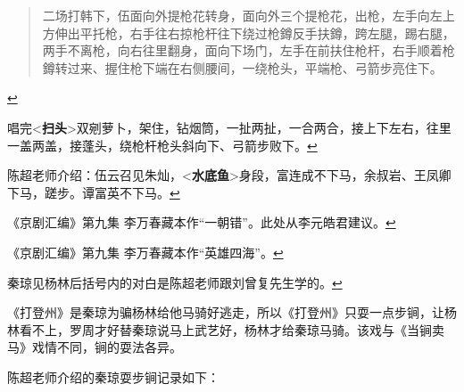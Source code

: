   \begin{quote}
  二场打韩下，伍面向外提枪花转身，面向外三个提枪花，出枪，左手向左上方伸出平托枪，右手往右掠枪杆往下绕过枪鐏反手扶鐏，跨左腿，踢右腿，两手不离枪，向右往里翻身，面向下场门，左手在前扶住枪杆，右手顺着枪鐏转过来、握住枪下端在右侧腰间，一绕枪头，平端枪、弓箭步亮住下。
  \end{quote}

  \protect\hyperlink{fnref317}{↩}
\item
  \leavevmode\hypertarget{fn318}{}%
  唱完\textless{}\textbf{扫头}\textgreater{}双剜萝卜，架住，钻烟筒，一扯两扯，一合两合，接上下左右，往里一盖两盖，接蓬头，绕枪杆枪头斜向下、弓箭步败下。\protect\hyperlink{fnref318}{↩}
\item
  \leavevmode\hypertarget{fn319}{}%
  陈超老师介绍：伍云召见朱灿，\textless{}\textbf{水底鱼}\textgreater{}身段，富连成不下马，余叔岩、王凤卿下马，蹉步。谭富英不下马。\protect\hyperlink{fnref319}{↩}
\item
  \leavevmode\hypertarget{fn320}{}%
  《京剧汇编》第九集
  李万春藏本作``一朝错''。此处从李元皓君建议。\protect\hyperlink{fnref320}{↩}
\item
  \leavevmode\hypertarget{fn321}{}%
  《京剧汇编》第九集
  李万春藏本作``英雄四海''。\protect\hyperlink{fnref321}{↩}
\item
  \leavevmode\hypertarget{fn322}{}%
  秦琼见杨林后括号内的对白是陈超老师跟刘曾复先生学的。\protect\hyperlink{fnref322}{↩}
\item
  \leavevmode\hypertarget{fn323}{}%
  《打登州》是秦琼为骗杨林给他马骑好逃走，所以《打登州》只耍一点步锏，让杨林看不上，罗周才好替秦琼说马上武艺好，杨林才给秦琼马骑。该戏与《当锏卖马》戏情不同，锏的耍法各异。

  陈超老师介绍的秦琼耍步锏记录如下：

